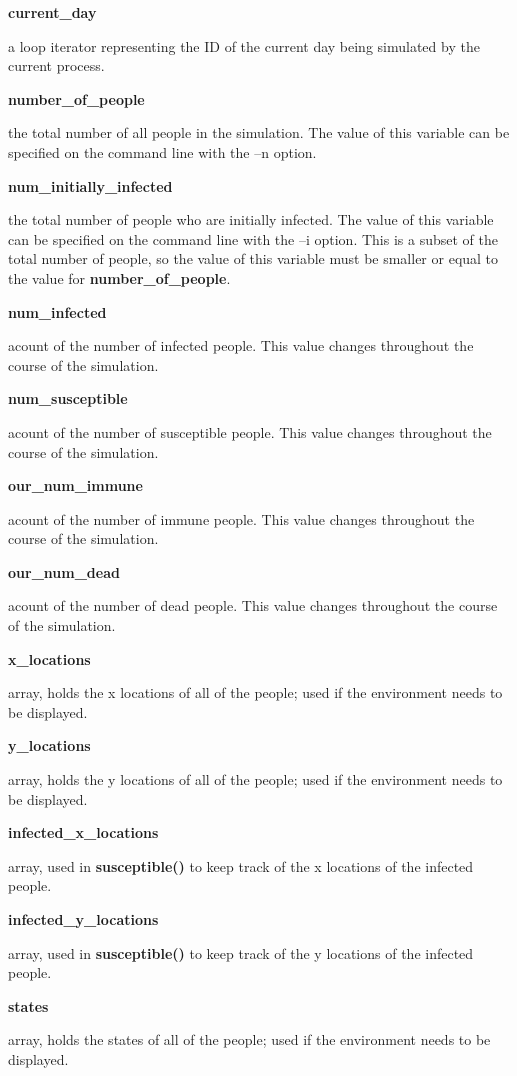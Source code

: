 \documentclass[letterpaper,10pt,openany,oneside]{sphinxmanual}
\begin{document}
\textbf{current\_day}

a loop iterator representing the ID of the current day being simulated by the current process.

\textbf{number\_of\_people}

the total number of all people in the simulation. The value of this variable can be specified on the command line with the –n option.

\textbf{num\_initially\_infected}

the total number of people who are initially infected. The value of this variable can be specified on the command line with the –i option. This is a subset of the total number of people, so the value of this variable must be smaller or equal to the value for \textbf{number\_of\_people}.

\textbf{num\_infected}

acount of the number of infected people. This value changes throughout the course of the simulation.

\textbf{num\_susceptible}

acount of the number of susceptible people. This value changes throughout the course of the simulation.

\textbf{our\_num\_immune}

acount of the number of immune people. This value changes throughout the course of the simulation.

\textbf{our\_num\_dead}

acount of the number of dead people. This value changes throughout the course of the simulation.

\textbf{x\_locations}

array, holds the x locations of all of the people; used if the environment needs to be displayed.

\textbf{y\_locations}

array, holds the y locations of all of the people; used if the environment needs to be displayed.

\textbf{infected\_x\_locations}

array, used in \textbf{susceptible()} to keep track of the x locations of the infected people.

\textbf{infected\_y\_locations}

array, used in \textbf{susceptible()} to keep track of the y locations of the infected people.

\textbf{states}

array, holds the states of all of the people; used if the environment needs to be displayed.
\end{document}
